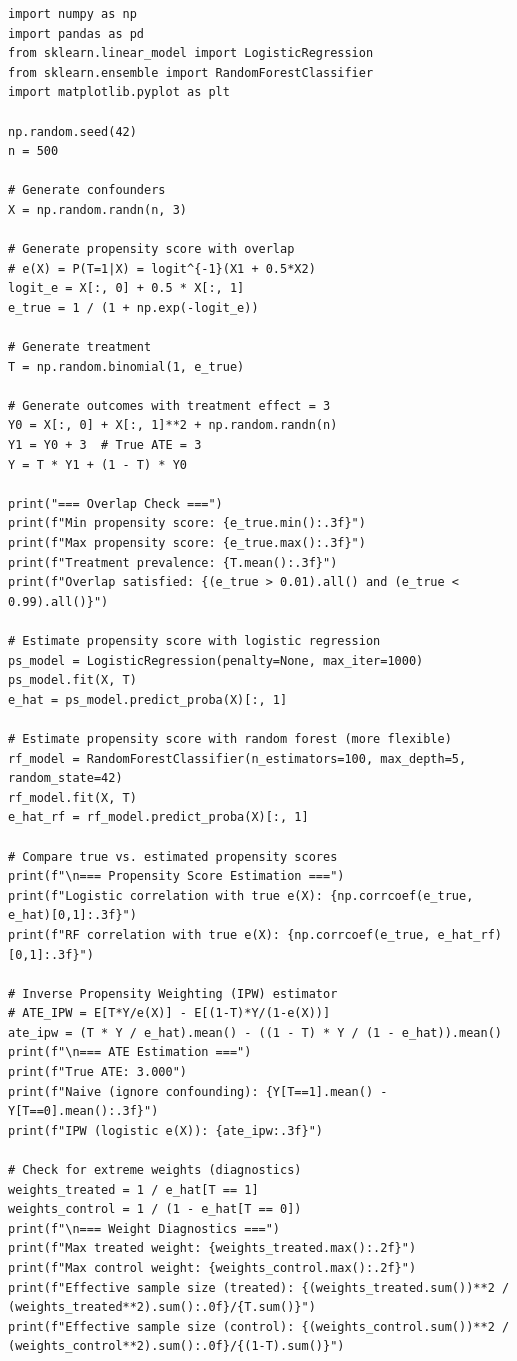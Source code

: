 \begin{verbatim}
import numpy as np
import pandas as pd
from sklearn.linear_model import LogisticRegression
from sklearn.ensemble import RandomForestClassifier
import matplotlib.pyplot as plt

np.random.seed(42)
n = 500

# Generate confounders
X = np.random.randn(n, 3)

# Generate propensity score with overlap
# e(X) = P(T=1|X) = logit^{-1}(X1 + 0.5*X2)
logit_e = X[:, 0] + 0.5 * X[:, 1]
e_true = 1 / (1 + np.exp(-logit_e))

# Generate treatment
T = np.random.binomial(1, e_true)

# Generate outcomes with treatment effect = 3
Y0 = X[:, 0] + X[:, 1]**2 + np.random.randn(n)
Y1 = Y0 + 3  # True ATE = 3
Y = T * Y1 + (1 - T) * Y0

print("=== Overlap Check ===")
print(f"Min propensity score: {e_true.min():.3f}")
print(f"Max propensity score: {e_true.max():.3f}")
print(f"Treatment prevalence: {T.mean():.3f}")
print(f"Overlap satisfied: {(e_true > 0.01).all() and (e_true < 0.99).all()}")

# Estimate propensity score with logistic regression
ps_model = LogisticRegression(penalty=None, max_iter=1000)
ps_model.fit(X, T)
e_hat = ps_model.predict_proba(X)[:, 1]

# Estimate propensity score with random forest (more flexible)
rf_model = RandomForestClassifier(n_estimators=100, max_depth=5, random_state=42)
rf_model.fit(X, T)
e_hat_rf = rf_model.predict_proba(X)[:, 1]

# Compare true vs. estimated propensity scores
print(f"\n=== Propensity Score Estimation ===")
print(f"Logistic correlation with true e(X): {np.corrcoef(e_true, e_hat)[0,1]:.3f}")
print(f"RF correlation with true e(X): {np.corrcoef(e_true, e_hat_rf)[0,1]:.3f}")

# Inverse Propensity Weighting (IPW) estimator
# ATE_IPW = E[T*Y/e(X)] - E[(1-T)*Y/(1-e(X))]
ate_ipw = (T * Y / e_hat).mean() - ((1 - T) * Y / (1 - e_hat)).mean()
print(f"\n=== ATE Estimation ===")
print(f"True ATE: 3.000")
print(f"Naive (ignore confounding): {Y[T==1].mean() - Y[T==0].mean():.3f}")
print(f"IPW (logistic e(X)): {ate_ipw:.3f}")

# Check for extreme weights (diagnostics)
weights_treated = 1 / e_hat[T == 1]
weights_control = 1 / (1 - e_hat[T == 0])
print(f"\n=== Weight Diagnostics ===")
print(f"Max treated weight: {weights_treated.max():.2f}")
print(f"Max control weight: {weights_control.max():.2f}")
print(f"Effective sample size (treated): {(weights_treated.sum())**2 / (weights_treated**2).sum():.0f}/{T.sum()}")
print(f"Effective sample size (control): {(weights_control.sum())**2 / (weights_control**2).sum():.0f}/{(1-T).sum()}")
\end{verbatim}

